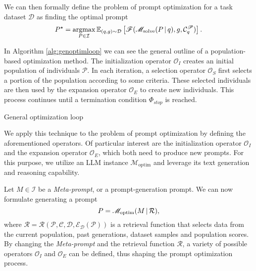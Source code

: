 We can then formally define the problem of prompt optimization for a task dataset $\mathcal{D}$ as finding the optimal prompt 
\begin{equation}
    \label{eq:optimdef}
    P^{\star} = \underset{P\in\mathcal{I}}{\operatorname{argmax}}\,\mathbb{E}_{(q, g) \sim \mathcal{D}}\left[\mathscr{F}(\mathscr{M}_{\text{solve}}(P \, \vert \, q), g, \mathcal{C}_{q}^{\mathscr{P}})\right].
\end{equation}

In Algorithm \ref{alg:genoptimloop} we can see the general outline of a population-based optimization method.
The initialization operator $\mathscr{O}_I$ creates an initial population of individuals $\mathscr{P}$. 
In each iteration, a selection operator $\mathscr{O}_S$ first selects a portion of the population according to some criteria. 
These selected individuals are then used by the expansion operator $\mathscr{O}_E$ to create new individuals.
This process continues until a termination condition $\Phi_{stop}$ is reached.

\begin{algorithm}
    \caption{General optimization loop}
    \label{alg:genoptimloop}
     
         
    \end{algorithm}
    
We apply this technique to the problem of prompt optimization by defining the aforementioned operators.
Of particular interest are the initialization operator $\mathscr{O}_I$ and the expansion operator $\mathscr{O}_E$, which
both need to produce new prompts. For this purpose, we utilize an LLM instance $\mathscr{M}_{\text{optim}}$ and leverage its 
text generation and reasoning capability.

Let $M\in\mathcal{I}$ be a \textit{Meta-prompt}, or a prompt-generation prompt. We can now formulate generating a prompt 
\begin{equation}
    \label{eq:metaprompting}
    P = \mathscr{M}_{\text{optim}}(M\, \vert \, \mathcal{R}),
\end{equation}
where $\mathcal{R} = \mathcal{R}(\mathscr{P}, \mathcal{C}, \mathcal{D}, \mathcal{E}_{\mathcal{D}}(\mathscr{P}))$ is a retrieval function that selects data
from the current population, past generations, dataset samples and population scores. 
By changing the \textit{Meta-prompt} and the retrieval function $\mathcal{R}$, a variety of possible operators $\mathscr{O}_I$ and $\mathscr{O}_E$
can be defined, thus shaping the prompt optimization process.  
